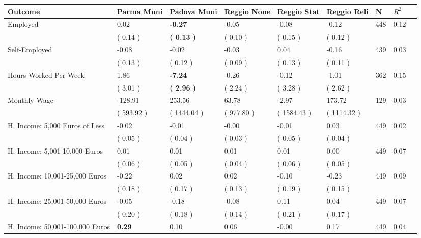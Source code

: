 \begin{tabular}{L{6.2cm} C{1.8cm} C{1.8cm} C{1.8cm} C{1.8cm} C{1.8cm} C{1.8cm} C{0.3cm} C{0.3cm}}
\toprule
 \textbf{Outcome} & \textbf{Parma Muni} & \textbf{Padova Muni} & \textbf{Reggio None} & \textbf{Reggio Stat} & \textbf{Reggio Reli} & \textbf{N} & \textbf{$ R^2$} \\
\midrule
Employed &      0.02 & \textbf{    -0.27} &     -0.05 &     -0.08 &     -0.12  & 448 &       0.12 \\ 
 & (     0.14 ) & \textbf{(     0.13 )} & (     0.10 ) & (     0.15 ) & (     0.12 )  & \\
Self-Employed &     -0.08 &     -0.02 &     -0.03 &      0.04 &     -0.16  & 439 &       0.03 \\ 
 & (     0.13 ) & (     0.12 ) & (     0.09 ) & (     0.13 ) & (     0.11 )  & \\
Hours Worked Per Week &      1.86 & \textbf{    -7.24} &     -0.26 &     -0.12 &     -1.01  & 362 &       0.15 \\ 
 & (     3.01 ) & \textbf{(     2.96 )} & (     2.24 ) & (     3.28 ) & (     2.62 )  & \\
Monthly Wage &   -128.91 &    253.56 &     63.78 &     -2.97 &    173.72  & 129 &       0.03 \\ 
 & (   593.92 ) & (  1444.04 ) & (   977.80 ) & (  1584.43 ) & (  1114.32 )  & \\
H. Income: 5,000 Euros of Less &     -0.02 &     -0.01 &     -0.00 &     -0.01 &      0.03  & 449 &       0.02 \\ 
 & (     0.05 ) & (     0.04 ) & (     0.03 ) & (     0.05 ) & (     0.04 )  & \\
H. Income: 5,001-10,000 Euros &      0.01 &      0.01 &      0.01 &      0.01 &      0.00  & 449 &       0.07 \\ 
 & (     0.06 ) & (     0.05 ) & (     0.04 ) & (     0.06 ) & (     0.05 )  & \\
H. Income: 10,001-25,000 Euros &     -0.22 &      0.02 &      0.02 &     -0.10 &     -0.23  & 449 &       0.09 \\ 
 & (     0.18 ) & (     0.17 ) & (     0.13 ) & (     0.19 ) & (     0.15 )  & \\
H. Income: 25,001-50,000 Euros &     -0.05 &     -0.18 &     -0.08 &      0.11 &      0.04  & 449 &       0.07 \\ 
 & (     0.20 ) & (     0.18 ) & (     0.14 ) & (     0.21 ) & (     0.17 )  & \\
H. Income: 50,001-100,000 Euros & \textbf{     0.29} &      0.10 &      0.06 &     -0.00 &      0.17  & 449 &       0.04 \\ 

\end{tabular}

